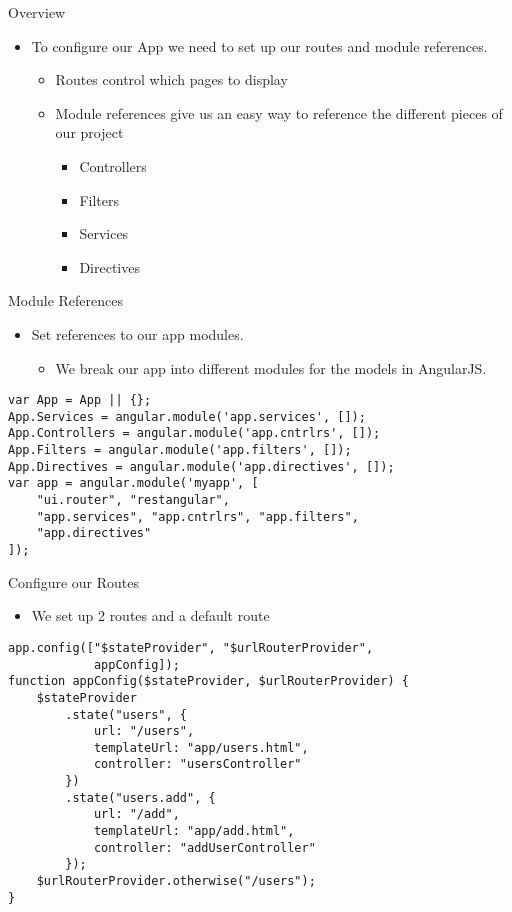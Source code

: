\documentclass[presentation]{beamer}
\begin{document}
\begin{frame}[label=sec-3-1]{Overview}
\begin{itemize}
\item To configure our App we need to set up our routes and module references.
\begin{itemize}
\item Routes control which pages to display
\item Module references give us an easy way to reference the different pieces of our project
\begin{itemize}
\item Controllers
\item Filters
\item Services
\item Directives
\end{itemize}
\end{itemize}
\end{itemize}
\end{frame}

\begin{frame}[fragile,label=sec-3-2]{Module References}
 \begin{itemize}
\item Set references to our app modules.
\begin{itemize}
\item We break our app into different modules for the models in AngularJS.
\end{itemize}
\end{itemize}
\begin{verbatim}
var App = App || {};
App.Services = angular.module('app.services', []);
App.Controllers = angular.module('app.cntrlrs', []);
App.Filters = angular.module('app.filters', []);
App.Directives = angular.module('app.directives', []);
var app = angular.module('myapp', [
    "ui.router", "restangular",
    "app.services", "app.cntrlrs", "app.filters",
    "app.directives"
]);
\end{verbatim}
\end{frame}

\begin{frame}[fragile,label=sec-3-3]{Configure our Routes}
 \begin{itemize}
\item We set up 2 routes and a default route
\end{itemize}
\begin{verbatim}
app.config(["$stateProvider", "$urlRouterProvider",
            appConfig]);
function appConfig($stateProvider, $urlRouterProvider) {
    $stateProvider
        .state("users", {
            url: "/users",
            templateUrl: "app/users.html",
            controller: "usersController"
        })
        .state("users.add", {
            url: "/add",
            templateUrl: "app/add.html",
            controller: "addUserController"
        });
    $urlRouterProvider.otherwise("/users");
}
\end{verbatim}
\end{frame}
\end{document}
